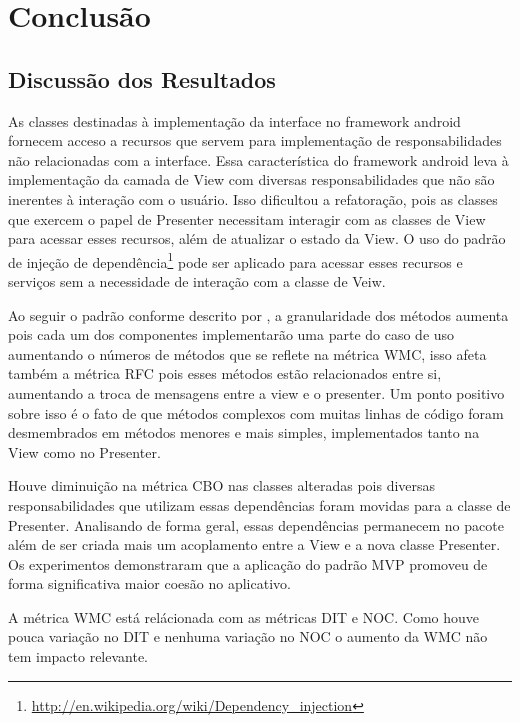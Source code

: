 \chapter{Conclusão}

\section{Discussão dos Resultados}
As classes destinadas à implementação da interface no framework android fornecem
acceso a recursos que servem para implementação de responsabilidades não
relacionadas com a interface. Essa característica do framework android leva à
implementação da camada de View com diversas responsabilidades que não são
inerentes à interação com o usuário. Isso dificultou a refatoração, pois as
classes que exercem o papel de Presenter necessitam interagir com as classes de
View para acessar esses recursos, além de atualizar o estado da View. O uso do
padrão de injeção de dependência\footnote{\url{http://en.wikipedia.org/wiki/Dependency_injection}}
pode ser aplicado para acessar esses recursos e serviços sem a necessidade de
interação com a classe de Veiw.

Ao seguir o padrão conforme descrito por , a granularidade dos
métodos aumenta pois cada um dos componentes implementarão uma parte do caso de
uso aumentando o números de métodos que se reflete na métrica WMC, isso afeta
também a métrica RFC pois esses métodos estão relacionados entre si, aumentando
a troca de mensagens entre a view e o presenter. Um ponto positivo sobre isso é o
fato de que métodos  complexos com muitas linhas de código foram desmembrados em
métodos menores e mais simples, implementados tanto na View como no Presenter.

Houve diminuição na métrica CBO nas classes alteradas pois diversas
responsabilidades que utilizam essas dependências foram movidas para a classe de
Presenter. Analisando de forma geral, essas dependências permanecem no pacote
além de ser criada mais um acoplamento entre a View e a nova classe Presenter.
Os experimentos demonstraram que a aplicação do padrão MVP promoveu de forma
significativa maior coesão no aplicativo.

A métrica WMC está relácionada com as métricas DIT e NOC. Como houve pouca
variação no DIT e nenhuma variação no NOC o aumento da WMC não tem impacto
relevante. 

